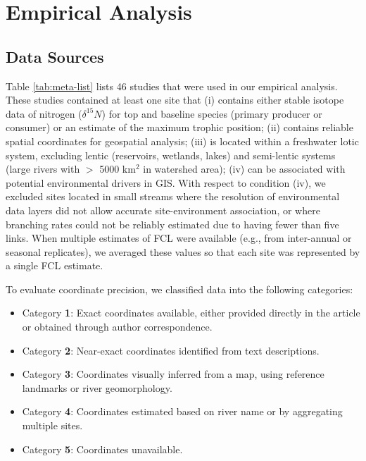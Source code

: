 \documentclass[11pt, class=article, crop=false]{standalone}
\theoremstyle{definition}
\begin{document}
\newpage

\section{Empirical Analysis}

\subsection{Data Sources}

Table \ref{tab:meta-list} lists 46 studies that were used in our empirical analysis.
These studies contained at least one site that (i) contains either stable isotope data of nitrogen ($\delta^{15}N$) for top and baseline species (primary producer or consumer) or an estimate of the maximum trophic position; (ii) contains reliable spatial coordinates for geospatial analysis; (iii) is located within a freshwater lotic system, excluding lentic (reservoirs, wetlands, lakes) and semi-lentic systems (large rivers with $>$ 5000 km$^2$ in watershed area); (iv) can be associated with potential environmental drivers in GIS.
With respect to condition (iv), we excluded sites located in small streams where the resolution of environmental data layers did not allow accurate site-environment association, or where branching rates could not be reliably estimated due to having fewer than five links.
When multiple estimates of FCL were available (e.g., from inter-annual or seasonal replicates), we averaged these values so that each site was represented by a single FCL estimate.

To evaluate coordinate precision, we classified data into the following categories:

\begin{itemize}
    \item Category \textbf{1}: Exact coordinates available, either provided directly in the article or obtained through author correspondence.
    \item Category \textbf{2}: Near-exact coordinates identified from text descriptions.
    \item Category \textbf{3}: Coordinates visually inferred from a map, using reference landmarks or river geomorphology.
    \item Category \textbf{4}: Coordinates estimated based on river name or by aggregating multiple sites.
    \item Category \textbf{5}: Coordinates unavailable.
\end{itemize}
\end{document}
